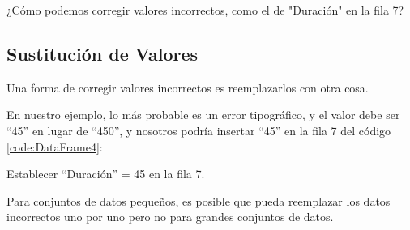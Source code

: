 \begin{code}
\begin{Shaded}
\begin{Highlighting}[]
\end{Highlighting}
\end{Shaded}
\label{code:DataFrame3}
\end{code}

¿Cómo podemos corregir valores incorrectos, como el de "Duración" en la fila 7?

\subsection{Sustitución de Valores}

Una forma de corregir valores incorrectos es reemplazarlos con otra
cosa.

En nuestro ejemplo, lo más probable es un error tipográfico, y el valor
debe ser ``45'' en lugar de ``450'', y nosotros podría insertar ``45'' en la
fila 7 del código \ref{code:DataFrame4}:\\

\begin{code} Establecer ``Duración'' = 45 en la fila 7.

\begin{Shaded}
\begin{Highlighting}[]
\NormalTok{df.loc[}\NormalTok{, }\NormalTok{] }\OperatorTok{=} 
\end{Highlighting}
\end{Shaded}
\label{code:DataFrame4}
\end{code}

Para conjuntos de datos pequeños, es posible que pueda reemplazar los
datos incorrectos uno por uno pero no para grandes conjuntos de datos.

